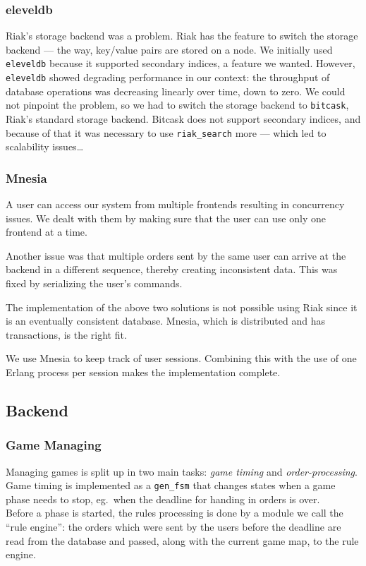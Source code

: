\documentclass[11pt,a4paper]{report}
\begin{document}
\subsubsection{eleveldb}
Riak's storage backend was a problem. Riak has the feature to switch the
storage backend --- the way, key/value pairs are stored on a node.
We initially used {\tt eleveldb} because it supported secondary indices, a
feature we wanted. However, {\tt eleveldb} showed degrading performance
in our context: the throughput of database operations was decreasing linearly
over time, down to zero. We could not pinpoint the problem, so we had to switch
the storage backend to {\tt bitcask}, Riak's standard storage backend.
Bitcask does not support secondary indices, and because of that it was
necessary to use {\tt riak\_search} more --- which led to scalability
issues\ldots

\subsubsection{Mnesia}
\label{sec:mnesia}
A user can access our system from multiple frontends resulting in
concurrency issues. We dealt with them by making sure that the user
can use only one frontend at a time.

Another issue was that multiple orders sent by the same user can arrive at the
backend in a different sequence, thereby creating inconsistent data. This was
fixed by serializing the user's commands.

The implementation of the above two solutions is not possible using Riak since
it is an eventually consistent database. Mnesia, which is distributed and has
transactions, is the right fit.

We use Mnesia to keep track of user sessions. Combining this with
the use of one Erlang process per session makes the implementation complete.


\subsection{Backend}
\subsubsection{Game Managing}
Managing games is split up in two main tasks: {\em game timing\/} and
{\em order-processing}. \\
Game timing is implemented as a {\tt gen\_fsm} that changes states when a game
phase needs to stop, eg.\ when the deadline for handing in orders is over.\\
Before a phase is started, the rules processing is done by a module we call
the ``rule engine'': the orders which were sent by the users before the
deadline are read from the database and passed, along with the current game
map, to the rule engine.
\end{document}
